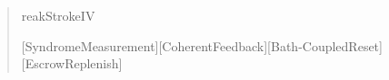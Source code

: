 \documentclass[
]{article}
\begin{document}
\begin{quote}
reak{}\hspace*{0.525em}\allowbreak{}\hspace*{0.525em}\allowbreak{}\hspace*{0.525em}\allowbreak{}\hspace*{0.525em}\allowbreak{}\hspace*{0.525em}\allowbreak{}\hspace*{0.525em}\allowbreak{}\hspace*{0.525em}\allowbreak{}\hspace*{0.525em}\allowbreak{}\hspace*{0.525em}\allowbreak{}\hspace*{0.525em}\allowbreak{}\hspace*{0.525em}\allowbreak{}\hspace*{0.525em}\allowbreak{}S\allowbreak{}t\allowbreak{}r\allowbreak{}o\allowbreak{}k\allowbreak{}e\allowbreak{}\hspace*{0.525em}\allowbreak{}I\allowbreak{}V\par
\noindent \hspace*{0.525em}\allowbreak{}[\allowbreak{}S\allowbreak{}y\allowbreak{}n\allowbreak{}d\allowbreak{}r\allowbreak{}o\allowbreak{}m\allowbreak{}e\allowbreak{}\hspace*{0.525em}\allowbreak{}M\allowbreak{}e\allowbreak{}a\allowbreak{}s\allowbreak{}u\allowbreak{}r\allowbreak{}e\allowbreak{}m\allowbreak{}e\allowbreak{}n\allowbreak{}t\allowbreak{}]\allowbreak{}\hspace*{0.525em}\allowbreak{}\hspace*{0.525em}\allowbreak{}[\allowbreak{}C\allowbreak{}o\allowbreak{}h\allowbreak{}e\allowbreak{}r\allowbreak{}e\allowbreak{}n\allowbreak{}t\allowbreak{}\hspace*{0.525em}\allowbreak{}F\allowbreak{}e\allowbreak{}e\allowbreak{}d\allowbreak{}b\allowbreak{}a\allowbreak{}c\allowbreak{}k\allowbreak{}]\allowbreak{}\hspace*{0.525em}\allowbreak{}\hspace*{0.525em}\allowbreak{}\hspace*{0.525em}\allowbreak{}[\allowbreak{}B\allowbreak{}a\allowbreak{}t\allowbreak{}h\allowbreak{}-\allowbreak{}C\allowbreak{}o\allowbreak{}u\allowbreak{}p\allowbreak{}l\allowbreak{}e\allowbreak{}d\allowbreak{}\hspace*{0.525em}\allowbreak{}R\allowbreak{}e\allowbreak{}s\allowbreak{}e\allowbreak{}t\allowbreak{}]\allowbreak{}\hspace*{0.525em}\allowbreak{}\hspace*{0.525em}\allowbreak{}\hspace*{0.525em}\allowbreak{}[\allowbreak{}E\allowbreak{}s\allowbreak{}c\allowbreak{}r\allowbreak{}o\allowbreak{}w\allowbreak{}\hspace*{0.525em}\allowbreak{}R\allowbreak{}e\allowbreak{}p\allowbreak{}l\allowbreak{}e\allowbreak{}n\allowbreak{}i\allowbreak{}s\allowbreak{}h\allowbreak{}]\par

\end{quote}
\end{document}
